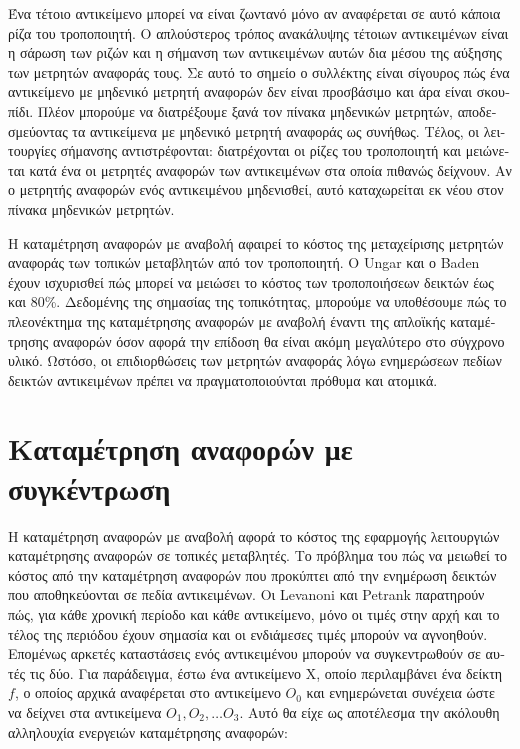 \begin{greek}
Ένα τέτοιο αντικείμενο μπορεί να είναι ζωντανό μόνο αν
αναφέρεται σε αυτό κάποια ρίζα του τροποποιητή. Ο απλούστερος
τρόπος ανακάλυψης τέτοιων αντικειμένων είναι η σάρωση των
ριζών και η σήμανση των αντικειμένων αυτών δια μέσου της
αύξησης των μετρητών αναφοράς τους. Σε αυτό το σημείο ο
συλλέκτης είναι σίγουρος πώς ένα αντικείμενο με μηδενικό
μετρητή αναφορών δεν είναι προσβάσιμο και άρα είναι σκουπίδι.
Πλέον μπορούμε να διατρέξουμε ξανά τον πίνακα μηδενικών
μετρητών, αποδεσμεύοντας τα αντικείμενα με μηδενικό μετρητή
αναφοράς ως συνήθως. Τέλος, οι λειτουργίες σήμανσης
αντιστρέφονται: διατρέχονται οι ρίζες του τροποποιητή και
μειώνεται κατά ένα οι μετρητές αναφορών των αντικειμένων
στα οποία πιθανώς δείχνουν. Αν ο μετρητής αναφορών ενός
αντικειμένου μηδενισθεί, αυτό καταχωρείται εκ νέου στον
πίνακα μηδενικών μετρητών.

Η καταμέτρηση αναφορών με αναβολή αφαιρεί το κόστος της
μεταχείρισης μετρητών αναφοράς των τοπικών μεταβλητών από
τον τροποποιητή. Ο Ungar \cite{DBLP:conf/sde/Ungar84} και
ο Baden \cite{baden1983low} έχουν ισχυρισθεί πώς μπορεί να
μειώσει το κόστος των τροποποιήσεων δεικτών έως και 80\%.
Δεδομένης της σημασίας της τοπικότητας, μπορούμε να υποθέσουμε
πώς το πλεονέκτημα της καταμέτρησης αναφορών με αναβολή έναντι
της απλοϊκής καταμέτρησης αναφορών όσον αφορά την επίδοση
θα είναι ακόμη μεγαλύτερο στο σύγχρονο υλικό. Ωστόσο, οι
επιδιορθώσεις των μετρητών αναφοράς λόγω ενημερώσεων πεδίων
δεικτών αντικειμένων πρέπει να πραγματοποιούνται πρόθυμα
και ατομικά.

\section{Καταμέτρηση αναφορών με συγκέντρωση}
Η καταμέτρηση αναφορών με αναβολή αφορά το κόστος της εφαρμογής
λειτουργιών καταμέτρησης αναφορών σε τοπικές μεταβλητές.
Το πρόβλημα του πώς να μειωθεί το κόστος από την καταμέτρηση
αναφορών που προκύπτει από την ενημέρωση δεικτών που
αποθηκεύονται σε πεδία αντικειμένων. Οι Levanoni και Petrank
\cite{levanoni1999scalable} παρατηρούν πώς, για κάθε χρονική
περίοδο και κάθε αντικείμενο, μόνο οι τιμές στην αρχή και
το τέλος της περιόδου έχουν σημασία και οι ενδιάμεσες τιμές
μπορούν να αγνοηθούν. Επομένως αρκετές καταστάσεις ενός
αντικειμένου μπορούν να συγκεντρωθούν σε αυτές τις δύο. Για
παράδειγμα, έστω ένα αντικείμενο X, οποίο περιλαμβάνει ένα
δείκτη $f$, ο οποίος αρχικά αναφέρεται στο αντικείμενο $O_0$
και ενημερώνεται συνέχεια ώστε να δείχνει στα αντικείμενα 
$O_1, O_2, \dots O_3$. Αυτό θα είχε ως αποτέλεσμα την ακόλουθη
αλληλουχία ενεργειών καταμέτρησης αναφορών:\\


\end{greek}
